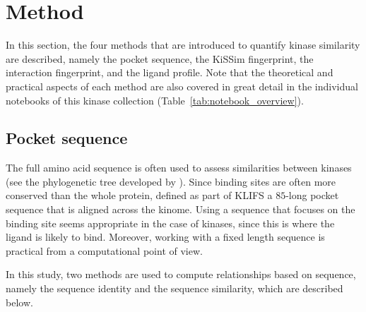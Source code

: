 \documentclass[9pt,training]{livecoms}
\begin{document}
\section{Method}
\label{sec:method}
In this section, the four methods that are introduced to quantify kinase similarity are described, namely the pocket sequence, the KiSSim fingerprint, the interaction fingerprint, and the ligand profile. Note that the theoretical and practical aspects of each method are also covered in great detail in the individual notebooks of this kinase collection (Table~\ref{tab:notebook_overview}).

\subsection{Pocket sequence}
The full amino acid sequence is often used to assess similarities between kinases (see the phylogenetic tree developed by \citet{Manning_2022_science}). Since binding sites are often more conserved than the whole protein, \citet{van_Linden_2013_JMedChem} defined as part of KLIFS a $85$-long pocket sequence that is aligned across the kinome. Using a sequence that focuses on the binding site seems appropriate in the case of kinases, since this is where the ligand is likely to bind. Moreover, working with a fixed length sequence is practical from a computational point of view. 

In this study, two methods are used to compute relationships based on sequence, namely the sequence identity and the sequence similarity, which are described below. 
\end{document}
